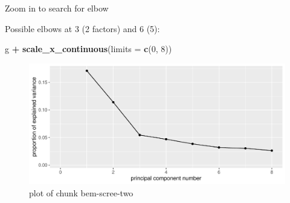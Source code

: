 \documentclass[ignorenonframetext,]{beamer}
\newenvironment{Shaded}{\begin{snugshade}}{\end{snugshade}}
\newcommand{\DataTypeTok}[1]{\textcolor[rgb]{0.13,0.29,0.53}{#1}}
\newcommand{\DecValTok}[1]{\textcolor[rgb]{0.00,0.00,0.81}{#1}}
\newcommand{\KeywordTok}[1]{\textcolor[rgb]{0.13,0.29,0.53}{\textbf{#1}}}
\newcommand{\NormalTok}[1]{#1}
\newcommand{\OperatorTok}[1]{\textcolor[rgb]{0.81,0.36,0.00}{\textbf{#1}}}
\newcommand{\StringTok}[1]{\textcolor[rgb]{0.31,0.60,0.02}{#1}}
\begin{document}
\begin{frame}[fragile]{Zoom in to search for elbow}
\protect\hypertarget{zoom-in-to-search-for-elbow}{}

Possible elbows at 3 (2 factors) and 6 (5):

\begin{Shaded}
\begin{Highlighting}[]
\NormalTok{g }\OperatorTok{+}\StringTok{ }\KeywordTok{scale_x_continuous}\NormalTok{(}\DataTypeTok{limits =} \KeywordTok{c}\NormalTok{(}\DecValTok{0}\NormalTok{, }\DecValTok{8}\NormalTok{))}
\end{Highlighting}
\end{Shaded}

\begin{figure}
\centering
\includegraphics{figure/bem-scree-two-1.pdf}
\caption{plot of chunk bem-scree-two}
\end{figure}

\end{frame}
\end{document}
